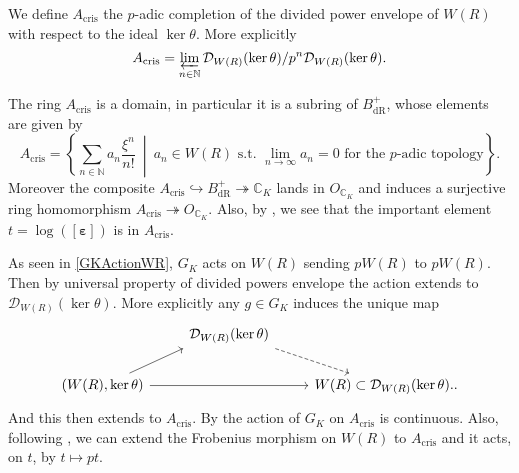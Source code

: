 \begin{defn}[]
	We define $A_{\mathrm{cris}}$ the $p$-adic completion of the
	divided power envelope of $W(R)$ with respect to the ideal $\ker \theta$.
	More explicitly
	\begin{equation*}
		A_{\mathrm{cris}} = \varprojlim_{n \in \mathbb{N}} 
		\mathcal{D}_{W(R)}(\ker\theta)/p^n\mathcal{D}_{W(R)}(\ker\theta)
	.\end{equation*}
\end{defn}


\begin{rem}
	The ring $A_{\mathrm{cris}}$ is a domain, in particular it is a subring
	of $B_{\mathrm{dR}}^+$, whose elements are given by
	\begin{equation*}
	A_{\mathrm{cris}} = 
	\left\{ \sum_{n \in \mathbb{N} }^{  } a_n \frac{ \xi^n }{ n! } \ \middle|\ 
	a_n \in W(R) \text{ s.t. } \lim_{n \to \infty} a_n = 0
	\text{ for the $p$-adic topology}\right\}
	.\end{equation*}
	Moreover the composite $A_{\mathrm{cris}} \hookrightarrow B_{\mathrm{dR}}^+ 
	\twoheadrightarrow \mathbb{C}_K$ lands in $O_{\mathbb{C}_K}$
	and induces a surjective ring homomorphism $A_{\mathrm{cris}} \twoheadrightarrow O_{\mathbb{C}_K}$.
	Also, by {\cite[Proposition 9.1.3]{Brinon}}, we see that the important
	element $t = \log ([\boldsymbol\varepsilon])$ is in $A_{\mathrm{cris}}$.
\end{rem}


\begin{rem}[]
	As seen in \cref{GKActionWR}, $G_K$ acts on $W(R)$ sending $pW(R)$ to $pW(R)$.
	Then by universal property of divided powers envelope the action extends to
	$\mathcal{D}_{W(R)}(\ker\theta)$.
	More explicitly any $g \in G_K$ induces the unique map
	\begin{equation*}
	\begin{tikzcd}
		&
		\mathcal{D}_{W(R)}(\ker\theta)
		\arrow[rd, "", dashrightarrow,
		start anchor=south east] & \\
		\left(W(R), \ker\theta\right) \arrow[ru, "", rightarrow,
		end anchor=south west] 
		\arrow[rr, "", rightarrow] & &
		W(R) \subset \mathcal{D}_{W(R)}(\ker\theta). 
	.\end{tikzcd}
	\end{equation*}
	And this then extends to $A_{\mathrm{cris}}$.
	By {\cite[Proposition 9.1.2]{Brinon}} the action
	of $G_K$ on $A_{\mathrm{cris}}$ is continuous.
	Also, following {\cite[Lemmas 9.1.7-9.1.8]{Brinon}},
	we can extend the Frobenius morphism on $W(R)$ to 
	$A_{\mathrm{cris}}$ and it acts, on $t$, by $t \mapsto pt$.
\end{rem}


